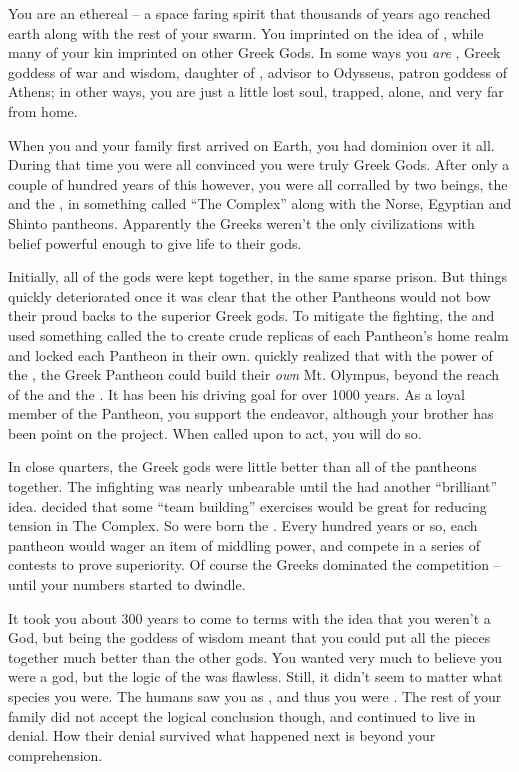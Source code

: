 \documentclass[char]{guardians}
\begin{document}
\name{\cAthena{}}

You are an ethereal -- a space faring spirit that thousands of years ago reached earth along with the rest of your swarm. You imprinted on the idea of \cAthena{}, while many of your kin imprinted on other Greek Gods. In some ways you \emph{are} \cAthena{}, Greek goddess of war and wisdom, daughter of \cZeus{}, advisor to Odysseus, patron goddess of Athens; in other ways, you are just a little lost soul, trapped, alone, and very far from home.

When you and your family first arrived on Earth, you had dominion over it all. During that time you were all convinced you were truly Greek Gods. After only a couple of hundred years of this however, you were all corralled by two beings, the \cCaretaker{} and the \cWarden{}, in something called ``The Complex'' along with the Norse, Egyptian and Shinto pantheons. Apparently the Greeks weren't the only civilizations with belief powerful enough to give life to their gods.

Initially, all of the gods were kept together, in the same sparse prison. But things quickly deteriorated once it was clear that the other Pantheons would not bow their proud backs to the superior Greek gods. To mitigate the fighting, the \cCaretaker{} and \cWarden{} used something called the \stone{} to create crude replicas of each Pantheon's home realm and locked each Pantheon in their own. \cZeus{} quickly realized that with the power of the \stone{}, the Greek Pantheon could build their \emph{own} Mt. Olympus, beyond the reach of the \cCaretaker{} and the \cWarden{}. It has been his driving goal for over 1000 years. As a loyal member of the Pantheon, you support the endeavor, although your brother \cHephaestus{} has been point on the project. When called upon to act, you will do so.

In close quarters, the Greek gods were little better than all of the pantheons together. The infighting was nearly unbearable until the \cCaretaker{} had another ``brilliant'' idea. \cCaretaker{\They} decided that some ``team building'' exercises would be great for reducing tension in The Complex. So were born the \pGames{}. Every hundred years or so, each pantheon would wager an item of middling power, and compete in a series of contests to prove superiority. Of course the Greeks dominated the competition -- until your numbers started to dwindle.

It took you about 300 years to come to terms with the idea that you weren't a God, but being the goddess of wisdom meant that you could put all the pieces together much better than the other gods. You wanted very much to believe you were a god, but the logic of the \cCaretaker{} was flawless. Still, it didn't seem to matter what species you were. The humans saw you as \cAthena{}, and thus you were \cAthena{}. The rest of your family did not accept the logical conclusion though, and continued to live in denial. How their denial survived what happened next is beyond your comprehension. 
\end{document}
